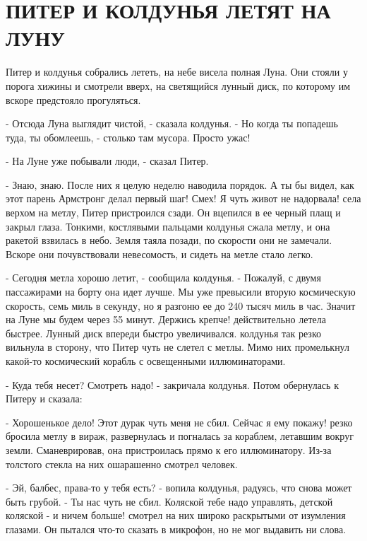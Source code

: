 \chapter{ПИТЕР И КОЛДУНЬЯ ЛЕТЯТ НА ЛУНУ}
\par{} Питер и колдунья собрались лететь, на небе висела полная 
Луна. Они стояли у порога хижины и смотрели вверх, на светящийся 
лунный диск, по которому им вскоре предстояло прогуляться.
\par- Отсюда Луна выглядит чистой, - сказала колдунья. - Но когда ты 
попадешь туда, ты обомлеешь, - столько там мусора. Просто ужас!
\par- На Луне уже побывали люди, - сказал Питер.
\par- Знаю, знаю. После них я целую неделю наводила порядок. А ты бы 
видел, как этот парень Армстронг делал первый шаг! Смех! Я чуть живот 
не надорвала!
 села верхом на метлу, Питер пристроился сзади. Он 
вцепился в ее черный плащ и закрыл глаза. Тонкими, костлявыми пальцами 
колдунья сжала метлу, и она ракетой взвилась в небо. Земля таяла 
позади, по скорости они не замечали. Вскоре они почувствовали 
невесомость, и сидеть на метле стало легко.
\par- Сегодня метла хорошо летит, - сообщила колдунья. - Пожалуй, с 
двумя пассажирами на борту она идет лучше. Мы уже превысили вторую 
космическую скорость, семь миль в секунду, но я разгоню ее до 240 
тысяч миль в час. Значит на Луне мы будем через 55 минут. Держись 
крепче!
 действительно летела быстрее. Лунный диск впереди быстро 
увеличивался.
 колдунья так резко вильнула в сторону, что Питер чуть не 
слетел с метлы. Мимо них промелькнул какой-то космический корабль с 
освещенными иллюминаторами.
\par- Куда тебя несет? Смотреть надо! - закричала колдунья. Потом 
обернулась к Питеру и сказала:
\par- Хорошенькое дело! Этот дурак чуть меня не сбил. Сейчас я ему 
покажу!
 резко бросила метлу в вираж, развернулась и погналась за 
кораблем, летавшим вокруг земли. Сманеврировав, она пристроилась прямо 
к его иллюминатору. Из-за толстого стекла на них ошарашенно смотрел 
человек.
\par- Эй, балбес, права-то у тебя есть? - вопила колдунья, радуясь, 
что снова может быть грубой. - Ты нас чуть не сбил. Коляской тебе надо 
управлять, детской коляской - и ничем больше!
 смотрел на них широко раскрытыми от изумления глазами. 
Он пытался что-то сказать в микрофон, но не мог выдавить ни слова. 
